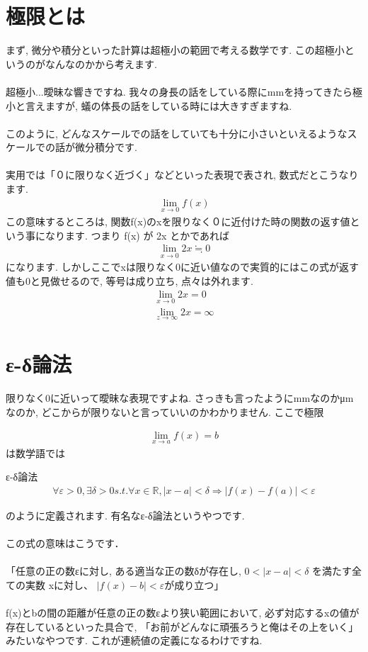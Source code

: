 \documentclass[11pt,a4paper]{jreport}
\begin{document}
\section{極限とは}
まず, 微分や積分といった計算は超極小の範囲で考える数学です. この超極小というのがなんなのかから考えます.\\
\\
超極小...曖昧な響きですね. 我々の身長の話をしている際にmmを持ってきたら極小と言えますが, 蟻の体長の話をしている時には大きすぎますね. \\
\\
このように, どんなスケールでの話をしていても十分に小さいといえるようなスケールでの話が微分積分です.\\
\\
実用では「０に限りなく近づく」などといった表現で表され, 数式だとこうなります.
\begin{eqnarray}
\lim_{x\to0} f(x)
\end{eqnarray}
この意味するところは, 関数f(x)のxを限りなく０に近付けた時の関数の返す値という事になります. つまり f(x) が 2x とかであれば
\begin{eqnarray}
\lim_{x\to0} 2x ≒ 0
\end{eqnarray}
になります. しかしここでxは限りなく0に近い値なので実質的にはこの式が返す値も0と見做せるので, 等号は成り立ち, 点々は外れます.
\begin{eqnarray}
\lim_{x\to0} 2x = 0\\
\lim_{z\to\infty} 2x = \infty
\end{eqnarray}
\section{ε-δ論法 \label{ed}}
限りなく0に近いって曖昧な表現ですよね. さっきも言ったようにmmなのかμmなのか, どこからが限りないと言っていいのかわかりません. ここで極限


\begin{eqnarray}
\lim_{x\to a} f(x) = b
\end{eqnarray}
は数学語では


\begin{screen}
ε-δ論法
\begin{eqnarray}
\forall \varepsilon >0, \exists \delta>0  s.t.  \forall x \in \mathbb{R}, |x-a|<\delta \Rightarrow |f(x)-f(a)|<\varepsilon
\label{eq:ed}
\end{eqnarray}
\end{screen}

のように定義されます. 有名なε-δ論法というやつです.\\
\\
この式の意味はこうです．\\
\\
「任意の正の数εに対し, ある適当な正の数δが存在し, $ 0 < |x − a| < δ$ を満たす全ての実数 xに対し、 $|f(x) − b| < ε$が成り立つ」\\
\\
f(x)とbの間の距離が任意の正の数εより狭い範囲において, 必ず対応するxの値が存在しているといった具合で, 「お前がどんなに頑張ろうと俺はその上をいく」みたいなやつです. これが連続値の定義になるわけですね.
\end{document}
